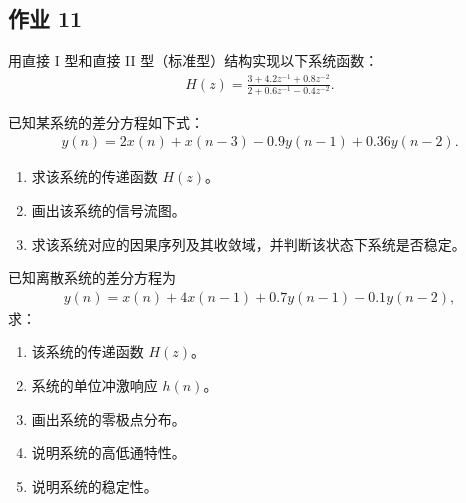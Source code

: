 \subsection{作业 11}

\begin{homework}
    用直接 I 型和直接 II 型（标准型）结构实现以下系统函数：
    \begin{align*}
        H(z) = \frac{3 + 4.2z^{-1}+0.8z^{-2}}{2 + 0.6z^{-1} - 0.4z^{-2}}.
    \end{align*}
\end{homework}

\begin{homework}
    已知某系统的差分方程如下式：
    \begin{align*}
        y(n) = 2x(n) + x(n - 3) - 0.9y(n - 1) + 0.36y(n - 2).
    \end{align*}
    \begin{enumerate}[label=(\arabic*)]
        \item 求该系统的传递函数 $H(z)$。
        \item 画出该系统的信号流图。
        \item 求该系统对应的因果序列及其收敛域，并判断该状态下系统是否稳定。
    \end{enumerate}
\end{homework}

\begin{homework}
    已知离散系统的差分方程为
    \begin{align*}
        y(n) = x(n) + 4x(n - 1) + 0.7y(n - 1) - 0.1y(n - 2),
    \end{align*}
    求：
    \begin{enumerate}[label=(\arabic*)]
        \item 该系统的传递函数 $H(z)$。
        \item 系统的单位冲激响应 $h(n)$。
        \item 画出系统的零极点分布。
        \item 说明系统的高低通特性。
        \item 说明系统的稳定性。
    \end{enumerate}
\end{homework}

